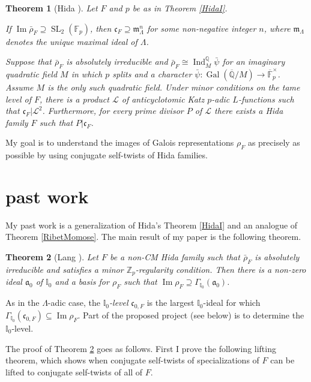 \documentclass[11pt]{amsart}
\newtheorem{thm}{Theorem}[section]
\theoremstyle{definition}
\theoremstyle{remark}
\def\Aa{\mathfrak{a}}
\def\cc{\mathfrak{c}}
\def\F{\mathbb{F}}
\def\I{\mathbb{I}}
\def\aL{\mathcal{L}}
\def\m{\mathfrak{m}}
\def\Q{\mathbb{Q}}
\def\Z{\mathbb{Z}}
\DeclareMathOperator{\Gal}{Gal}
\DeclareMathOperator{\im}{Im}
\DeclareMathOperator{\Ind}{Ind}
\DeclareMathOperator{\SL}{SL}
\begin{document}
\begin{thm}[Hida \cite{Hida15}]\label{HidaII}
Let $F$ and $p$ be as in Theorem \ref{HidaI}.
\begin{enumerate*}
\item If $\im \bar{\rho}_F \supseteq \SL_2(\F_p)$, then $\cc_F \supseteq \m_\Lambda^n$ for some non-negative integer $n$, where $\m_\Lambda$ denotes the unique maximal ideal of $\Lambda$.

\item\label{Katz case} Suppose that $\bar{\rho}_F$ is absolutely irreducible and $\bar{\rho}_F \cong \Ind_M^\Q \bar{\psi}$ for an imaginary quadratic field $M$ in which $p$ splits and a character $\bar{\psi} : \Gal(\overline{\Q}/M) \to \overline{\F}_p^\times$.  Assume $M$ is the only such quadratic field.  Under minor conditions on the tame level of $F$, there is a product $\aL$ of anticyclotomic Katz $p$-adic $L$-functions such that $\cc_F | \aL^2$.  Furthermore, for every prime divisor $P$ of $\aL$ there exists a Hida family $F$ such that $P | \cc_F$.
\end{enumerate*} 
\end{thm}

My goal is to understand the images of Galois representations $\rho_F$ as precisely as possible by using conjugate self-twists of Hida families.

\section*{past work}
My past work is a generalization of Hida's Theorem \ref{HidaI} and an analogue of Theorem \ref{RibetMomose}.  The main result of my paper \cite{Lang15} is the following theorem.

\begin{thm}[Lang \cite{Lang15}]\label{Lang}
Let $F$ be a non-CM Hida family such that $\bar{\rho}_F$ is absolutely irreducible and satisfies a minor $\Z_p$-regularity condition.  Then there is a non-zero ideal $\Aa_0$ of $\I_0$ and a basis for $\rho_F$ such that $\im \rho_F \supseteq \Gamma_{\I_0}(\Aa_0)$.
\end{thm}

As in the $\Lambda$-adic case, the \textit{$\I_0$-level} $\cc_{0,F}$ is the largest $\I_0$-ideal for which $\Gamma_{\I_0}(\cc_{0,F}) \subseteq \im \rho_F$.  Part of the proposed project (see below) is to determine the $\I_0$-level.

The proof of Theorem \ref{Lang} goes as follows.  First I prove the following lifting theorem, which shows when conjugate self-twists of specializations of $F$ can be lifted to conjugate self-twists of all of $F$.  
\end{document}
